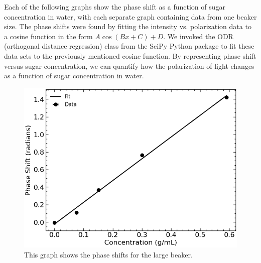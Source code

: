 \newpage
Each of the following graphs show the phase shift as a function of sugar concentration in water, with each separate graph containing data from one beaker size. 
The phase shifts were found by fitting the intensity vs. polarization data to a cosine function in the form $A\cos{\left(Bx+C\right)}+D$. We invoked the ODR (orthogonal distance regression) class from the SciPy Python package to fit these data sets to the previously mentioned cosine function. By representing phase shift versus sugar concentration, we can quantify how the polarization of light changes as a function of sugar concentration in water.

\begin{figure}[H]
    \begin{center}
        \includegraphics[width=\columnwidth]{../figures/large_beaker_phase_shifts.png}
    \end{center}
    \caption{This graph shows the phase shifts for the large beaker.}
    \label{fig:large_beaker_phase_shifts}
\end{figure}


